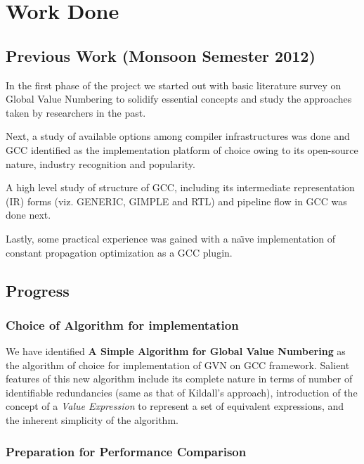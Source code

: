 \chapter{Work Done}

\section{Previous Work (Monsoon Semester 2012)}

In the first phase of the project we started out with basic literature survey on Global Value Numbering to solidify essential concepts and study the approaches taken by researchers in the past.

Next, a study of available options among compiler infrastructures was done and GCC\cite{gcc} identified as the implementation platform of choice owing to its open-source nature, industry recognition and popularity.

A high level study of structure of GCC, including its intermediate representation (IR) forms (viz. GENERIC\cite{generic}, GIMPLE\cite{gimple} and RTL\cite{rtl}) and pipeline flow in GCC was done next.

Lastly, some practical experience was gained with a na\"{\i}ve implementation of constant propagation optimization as a GCC plugin.

\section{Progress}

\subsection{Choice of Algorithm for implementation}

We have identified \textbf{A Simple Algorithm for Global Value Numbering}\cite{simple-gvn} as the algorithm of choice for implementation of GVN on GCC framework. Salient features of this new algorithm include its complete nature in terms of number of identifiable redundancies (same as that of Kildall's approach), introduction of the concept of a \textit{Value Expression} to represent a set of equivalent expressions, and the inherent simplicity of the algorithm.

\subsection{Preparation for Performance Comparison}


